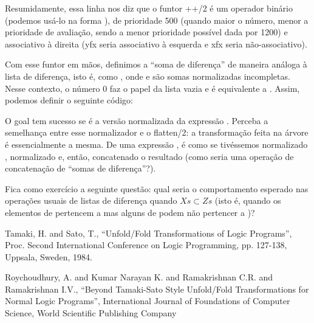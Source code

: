 \documentclass{article}
\begin{document}

\noindent Resumidamente, essa linha nos diz que o funtor ++/2 é um operador binário (podemos usá-lo na forma ), de prioridade
500 (quando maior o número, menor a prioridade de avaliação, sendo a menor prioridade possível dada por 1200) e associativo à direita (yfx seria associativo à esquerda e xfx seria não-associativo).

Com esse funtor em mãos, definimos a ``soma de diferença'' de maneira análoga à lista de diferença, isto é, como ,
onde  e  são somas normalizadas incompletas. Nesse contexto, o número 0 faz o papel da lista vazia e
 é equivalente a . Assim, podemos definir o seguinte código:

\label{lst:norm}

\noindent O goal  tem sucesso se  é a versão normalizada da expressão .
Perceba a semelhança entre esse normalizador e o flatten/2: a transformação feita na árvore é essencialmente a mesma. De uma
expressão , é como se tivéssemos normalizado , normalizado  e, então, concatenado o
resultado (como seria uma operação de concatenação de ``somas de diferença''?).

Fica como exercício a seguinte questão: qual seria o comportamento esperado nas operações usuais de listas de diferença
 quando $Xs \subset Zs$
(isto é, quando os elementos de  pertencem a  mas alguns de  podem não pertencer a )?


  \begin{thebibliography}{1}


    Tamaki, H. and Sato, T.,
    ``Unfold/Fold Transformations of Logic Programs'',
    Proc. Second International Conference on Logic Programming,
    pp. 127-138,
    Uppsala, Sweden, 1984.


    Roychoudhury, A. and Kumar Narayan K. and Ramakrishnan C.R. and Ramakrishnan I.V.,
    ``Beyond Tamaki-Sato Style Unfold/Fold Transformations for Normal Logic Programs'',
    International Journal of Foundations of Computer Science,
    World Scientific Publishing Company


  \end{thebibliography}
\end{document}
